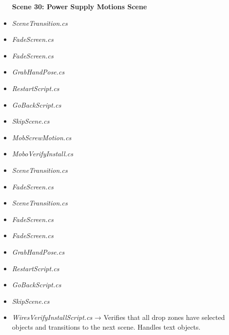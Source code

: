 \documentclass[10pt,twocolumn]{article}
\begin{document}
\begin{itemize}
    \textbf{Scene 30:  Power Supply Motions Scene}\\
    \item \textit{SceneTransition.cs}\\
    \item \textit{FadeScreen.cs}
\end{itemize}

\begin{itemize}
    \textbf{Scene 31:  Power Supply Install Scene}\\
    \item \textit{FadeScreen.cs}\\
    \item \textit{GrabHandPose.cs}\\
    \item \textit{RestartScript.cs}\\
    \item \textit{GoBackScript.cs}\\
    \item \textit{SkipScene.cs}\\
    \item \textit{MobScrewMotion.cs}\\
    \item \textit{MoboVerifyInstall.cs} 
\end{itemize}

\begin{itemize}
    \textbf{Scene 32:  Wires Informational Scene}\\
    \item \textit{SceneTransition.cs}\\
    \item \textit{FadeScreen.cs}
\end{itemize}

\begin{itemize}
    \textbf{Scene 33:  Wires Motions Scene}\\
    \item \textit{SceneTransition.cs}\\
    \item \textit{FadeScreen.cs}
\end{itemize}

\begin{itemize}
    \textbf{Scene 34:  Wires Install Scene}\\
    \item \textit{FadeScreen.cs}\\
    \item \textit{GrabHandPose.cs}\\
    \item \textit{RestartScript.cs}\\
    \item \textit{GoBackScript.cs}\\
    \item \textit{SkipScene.cs}\\
    \item \textit{WiresVerifyInstallScript.cs} → Verifies that all drop zones have selected objects and transitions to the next scene. Handles text objects. 
\end{itemize}
\end{document}

